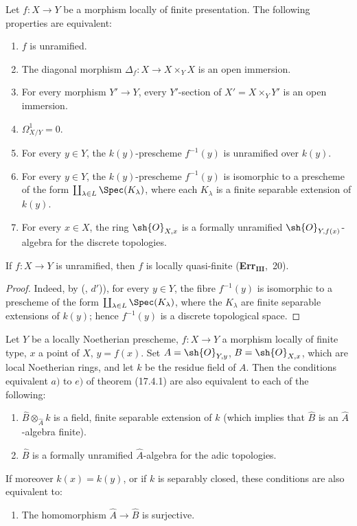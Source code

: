 \begin{corollary}[17.4.2]
\label{IV.17.4.2.cor}
Let $f:X\to Y$ be a morphism locally of finite presentation.
The following properties are equivalent:
\begin{enumerate}[label=(\alph*)]
  \item $f$ is unramified.
  \item The diagonal morphism $\Delta_f:X\to X\times_Y X$ is an open immersion.
  \item[b')] For every morphism $Y'\to Y$, every $Y'$-section of $X'=X\times_Y Y'$ is an open immersion.
  \item $\Omega^1_{X/Y}=0$.
  \item For every $y\in Y$, the $k(y)$-prescheme $f^{-1}(y)$ is unramified over $k(y)$.
  \item[d')] For every $y\in Y$, the $k(y)$-prescheme $f^{-1}(y)$ is isomorphic to a prescheme of the form $\coprod_{\lambda\in L}\Spec(K_\lambda)$, where each $K_\lambda$ is a finite separable extension of $k(y)$.
  \item For every $x\in X$, the ring $\sh{O}_{X,x}$ is a formally unramified $\sh{O}_{Y,f(x)}$-algebra for the discrete topologies.
\end{enumerate}
\end{corollary}

\begin{corollary}[17.4.3]
\label{IV.17.4.3}
If $f:X\to Y$ is unramified, then $f$ is locally quasi-finite (\textbf{Err}$_\textbf{III}$,~20).
\end{corollary}

\begin{proof}
Indeed, by (, $d'$)), for every $y\in Y$, the fibre $f^{-1}(y)$ is isomorphic to a prescheme of the form $\coprod_{\lambda\in L}\Spec(K_\lambda)$, where the $K_\lambda$ are finite separable extensions of $k(y)$; hence $f^{-1}(y)$ is a discrete topological space.
\end{proof}

\begin{proposition}[17.4.4]
\label{IV.17.4.4}
Let $Y$ be a locally Noetherian prescheme, $f:X\to Y$ a morphism locally of finite type, $x$ a point of $X$, $y=f(x)$.
Set $A=\sh{O}_{Y,y}$, $B=\sh{O}_{X,x}$, which are local Noetherian rings, and let $k$ be the residue field of $A$.
Then the conditions equivalent $a)$ to $e)$ of theorem (17.4.1) are also equivalent to each of the following:
\begin{enumerate}
  \item[f)] $\hat{B}\otimes_{\hat{A}}k$ is a field, finite separable extension of $k$ (which implies that $\hat{B}$ is an $\hat{A}$-algebra finite).
  \item[f')] $\hat{B}$ is a formally unramified $\hat{A}$-algebra for the adic topologies.
\end{enumerate}
If moreover $k(x)=k(y)$, or if $k$ is separably closed, these conditions are also equivalent to:
\begin{enumerate}
  \item[f'')] The homomorphism $\hat{A}\to\hat{B}$ is surjective.
\end{enumerate}
\end{proposition}

